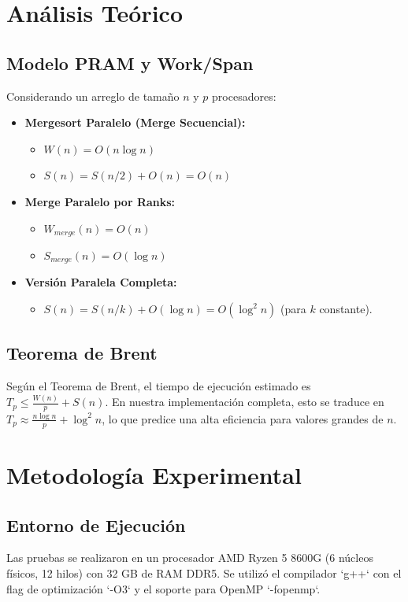 \documentclass[12pt, a4paper]{article}
\begin{document}
\section{Análisis Teórico}

\subsection{Modelo PRAM y Work/Span}
Considerando un arreglo de tamaño $n$ y $p$ procesadores:
\begin{itemize}
    \item \textbf{Mergesort Paralelo (Merge Secuencial):}
    \begin{itemize}
        \item $W(n) = O(n \log n)$
        \item $S(n) = S(n/2) + O(n) = O(n)$
    \end{itemize}
    \item \textbf{Merge Paralelo por Ranks:}
    \begin{itemize}
        \item $W_{merge}(n) = O(n)$
        \item $S_{merge}(n) = O(\log n)$
    \end{itemize}
    \item \textbf{Versión Paralela Completa:}
    \begin{itemize}
        \item $S(n) = S(n/k) + O(\log n) = O(\log^2 n)$ (para $k$ constante).
    \end{itemize}
\end{itemize}

\subsection{Teorema de Brent}
Según el Teorema de Brent, 
el tiempo de ejecución estimado es $T_p \leq \frac{W(n)}{p} + S(n)$. 
En nuestra implementación completa, esto se traduce en $T_p \approx \frac{n \log n}{p} + \log^2 n$, 
lo que predice una alta eficiencia para valores grandes de $n$.

\section{Metodología Experimental}

\subsection{Entorno de Ejecución}
Las pruebas se realizaron en un procesador AMD Ryzen 5 8600G (6 núcleos físicos, 12 hilos) con 32 GB de RAM DDR5. 
Se utilizó el compilador `g++` con el flag de optimización `-O3` y el soporte para OpenMP `-fopenmp`.
\end{document}
